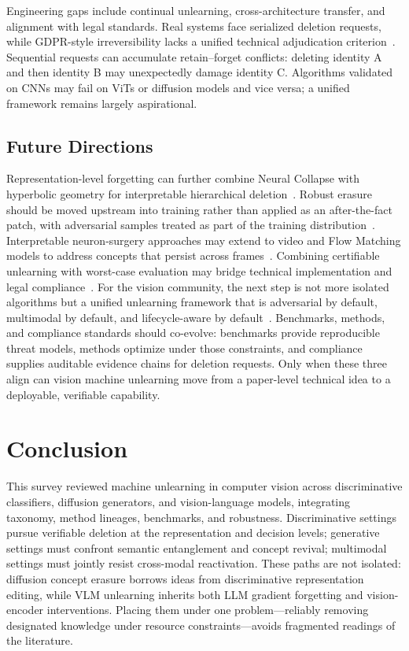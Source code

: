 \documentclass[10pt,twocolumn,letterpaper]{article}
\begin{document}
Engineering gaps include continual unlearning, cross-architecture transfer, and alignment with legal standards. Real systems face serialized deletion requests, while GDPR-style irreversibility lacks a unified technical adjudication criterion~\cite{marasco2026}. Sequential requests can accumulate retain--forget conflicts: deleting identity A and then identity B may unexpectedly damage identity C. Algorithms validated on CNNs may fail on ViTs or diffusion models and vice versa; a unified framework remains largely aspirational.

\subsection{Future Directions}

Representation-level forgetting can further combine Neural Collapse with hyperbolic geometry for interpretable hierarchical deletion~\cite{safavigerdini2026,lin2026vlm}. Robust erasure should be moved upstream into training rather than applied as an after-the-fact patch, with adversarial samples treated as part of the training distribution~\cite{zhang2024advunlearn}. Interpretable neuron-surgery approaches may extend to video and Flow Matching models to address concepts that persist across frames~\cite{safavigerdini2026}. Combining certifiable unlearning with worst-case evaluation may bridge technical implementation and legal compliance~\cite{safavigerdini2026}. For the vision community, the next step is not more isolated algorithms but a unified unlearning framework that is adversarial by default, multimodal by default, and lifecycle-aware by default~\cite{marasco2026}. Benchmarks, methods, and compliance standards should co-evolve: benchmarks provide reproducible threat models, methods optimize under those constraints, and compliance supplies auditable evidence chains for deletion requests. Only when these three align can vision machine unlearning move from a paper-level technical idea to a deployable, verifiable capability.

\section{Conclusion}

This survey reviewed machine unlearning in computer vision across discriminative classifiers, diffusion generators, and vision-language models, integrating taxonomy, method lineages, benchmarks, and robustness. Discriminative settings pursue verifiable deletion at the representation and decision levels; generative settings must confront semantic entanglement and concept revival; multimodal settings must jointly resist cross-modal reactivation. These paths are not isolated: diffusion concept erasure borrows ideas from discriminative representation editing, while VLM unlearning inherits both LLM gradient forgetting and vision-encoder interventions. Placing them under one problem---reliably removing designated knowledge under resource constraints---avoids fragmented readings of the literature.
\end{document}
